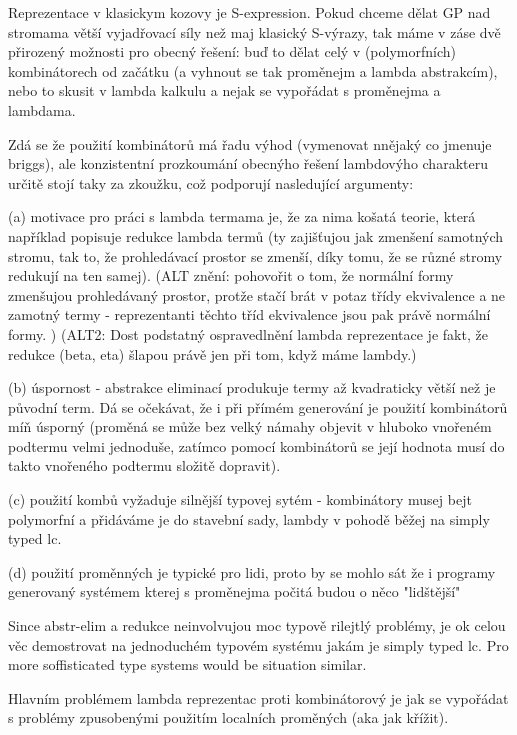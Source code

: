 \documentclass{sig-alternate}
\newcommand{\red}[1]{{\color{red} #1}}
\begin{document}
\red{ 
Reprezentace v klasickym kozovy je S-expression.
Pokud chceme dělat GP nad stromama větší vyjadřovací síly než maj klasický S-výrazy, tak máme v záse dvě přirozený možnosti pro obecný řešení: buď to dělat celý v (polymorfních) kombinátorech od začátku (a vyhnout se tak proměnejm a lambda abstrakcím), nebo to skusit v lambda kalkulu a nejak se vypořádat s proměnejma a lambdama. 

Zdá se že použití kombinátorů má řadu výhod (vymenovat nnějaký co jmenuje briggs), 
ale konzistentní prozkoumání obecnýho řešení lambdovýho charakteru určitě stojí 
taky za zkoužku, což podporují nasledující argumenty:

  (a) motivace pro práci s lambda termama je, že za nima košatá teorie, 
      která například popisuje redukce lambda termů (ty zajišťujou jak 
      zmenšení samotných stromu, tak to, že prohledávací prostor se zmenší, 
      díky tomu, že se různé stromy redukují na ten samej).
      (ALT znění: 
      pohovořit o tom, že normální formy zmenšujou prohledávaný prostor, 
      protže stačí brát v potaz třídy ekvivalence a ne zamotný termy 
      - reprezentanti těchto tříd ekvivalence jsou pak právě normální formy. )
      (ALT2: 
      Dost podstatný ospravedlnění lambda reprezentace je fakt, 
      že redukce (beta, eta) šlapou právě jen při tom, když máme lambdy.)

  (b) úspornost - abstrakce eliminací produkuje 
      termy až kvadraticky větší než je původní 
      term. Dá se očekávat, že i při přímém generování je použití kombinátorů 
      míň úsporný (proměná se může bez velký námahy objevit v hluboko vnořeném
      podtermu velmi jednoduše, zatímco pomocí kombinátorů se její hodnota musí do
      takto vnořeného podtermu složitě dopravit). 

  (c) použití kombů vyžaduje silnější typovej sytém - 
      kombinátory musej bejt polymorfní a přidáváme je do stavební sady,
      lambdy v pohodě běžej na simply typed lc. 

  (d) použití proměnných je typické pro lidi, proto by se mohlo sát že
      i programy generovaný systémem kterej s proměnejma počitá budou o něco 
      "lidštější"



Since abstr-elim a redukce neinvolvujou moc typově rilejtlý problémy, je ok celou věc demostrovat na jednoduchém typovém systému jakám je simply typed lc. Pro more soffisticated type systems would be situation similar.

Hlavním problémem lambda reprezentac proti kombinátorový je 
jak se vypořádat s problémy zpusobenými použitím 
localních proměných (aka jak křížit).

}
\end{document}
